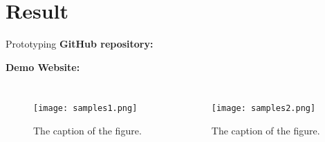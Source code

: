 \section{Result} 
			
\begin{frame}{Prototyping}
	\textbf{GitHub repository:} \url{}
																
	\textbf{Demo Website:} \url{}
							
	\begin{columns}
		\begin{figure}
			\centering
			\texttt{[image: samples1.png]}
			\caption{The caption of the figure.}
		\end{figure}	
		\begin{figure}
			\centering
			\texttt{[image: samples2.png]}
			\caption{The caption of the figure.}
		\end{figure}
	\end{columns}
	\note{}
\end{frame}

